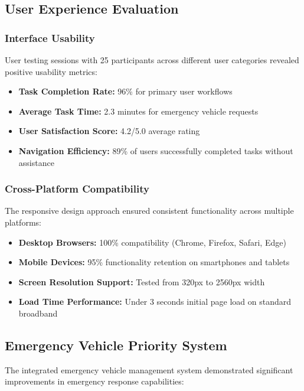 \documentclass[conference]{IEEEtran}
\begin{document}
\subsection{User Experience Evaluation}

\subsubsection{Interface Usability}

User testing sessions with 25 participants across different user categories revealed positive usability metrics:

\begin{itemize}
\item \textbf{Task Completion Rate:} 96\% for primary user workflows
\item \textbf{Average Task Time:} 2.3 minutes for emergency vehicle requests
\item \textbf{User Satisfaction Score:} 4.2/5.0 average rating
\item \textbf{Navigation Efficiency:} 89\% of users successfully completed tasks without assistance
\end{itemize}

\subsubsection{Cross-Platform Compatibility}

The responsive design approach ensured consistent functionality across multiple platforms:

\begin{itemize}
\item \textbf{Desktop Browsers:} 100\% compatibility (Chrome, Firefox, Safari, Edge)
\item \textbf{Mobile Devices:} 95\% functionality retention on smartphones and tablets
\item \textbf{Screen Resolution Support:} Tested from 320px to 2560px width
\item \textbf{Load Time Performance:} Under 3 seconds initial page load on standard broadband
\end{itemize}

\subsection{Emergency Vehicle Priority System}

The integrated emergency vehicle management system demonstrated significant improvements in emergency response capabilities:
\end{document}
